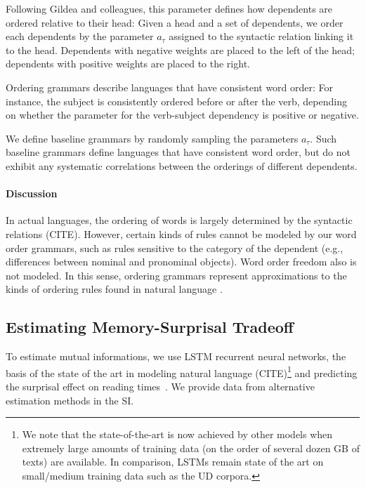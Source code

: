 Following Gildea and colleagues, this parameter defines how dependents are ordered relative to their head:
Given a head and a set of dependents, we order each dependents by the parameter $a_\tau$ assigned to the syntactic relation linking it to the head.
Dependents with negative weights are placed to the left of the head; dependents with positive weights are placed to the right.

Ordering grammars describe languages that have consistent word order:
For instance, the subject is consistently ordered before or after the verb, depending on whether the parameter for the verb-subject dependency is positive or negative.

We define baseline grammars by randomly sampling the parameters $a_\tau$.
Such baseline grammars define languages that have consistent word order, but do not exhibit any systematic correlations between the orderings of different dependents.



\paragraph{Discussion}
In actual languages, the ordering of words is largely determined by the syntactic relations (CITE).
However, certain kinds of rules cannot be modeled by our word order grammars, such as rules sensitive to the category of the dependent (e.g., differences between nominal and pronominal objects).
Word order freedom also is not modeled.
In this sense, ordering grammars represent approximations to the kinds of ordering rules found in natural language \cite{gildea-optimizing-2007, gildea-grammars-2010, gildea-human-2015}.



\subsection{Estimating Memory-Surprisal Tradeoff}\label{sec:method}
To estimate mutual informations, we use LSTM recurrent neural networks, the basis of the state of the art in modeling natural language (CITE)\footnote{We note that the state-of-the-art is now achieved by other models when extremely large amounts of training data (on the order of several dozen GB of texts) are available. In comparison, LSTMs remain state of the art on small/medium training data such as the UD corpora.} and predicting the surprisal effect on reading times~\citep{frank-insensitivity-2011, goodkind-predictive-2018}.
We provide data from alternative estimation methods in the SI.




